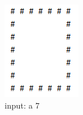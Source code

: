 \begin{figure}[H]
    \centering
	\begin{subfigure}{0.19\linewidth}
		\centering
		\includegraphics[width=1\linewidth]{../pic/4/4.a.png}
        \caption{input: a 7}
	\end{subfigure}
	\begin{subfigure}{0.19\linewidth}
		\centering

\end{subfigure}
\end{figure}
